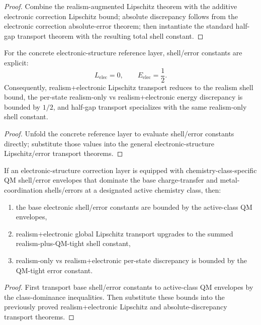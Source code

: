 \begin{proof}
Combine the realism-augmented Lipschitz theorem with the additive electronic correction Lipschitz bound; absolute discrepancy follows from the electronic correction absolute-error theorem; then instantiate the standard half-gap transport theorem with the resulting total shell constant.
\end{proof}

\begin{theorem}\label{thm:electronic-reference-shell-error-transport}
For the concrete electronic-structure reference layer, shell/error constants are explicit:
\[
L_{\mathrm{elec}}=0,\qquad E_{\mathrm{elec}}=\frac12.
\]
Consequently, realism+electronic Lipschitz transport reduces to the realism shell bound, the per-state realism-only vs realism+electronic energy discrepancy is bounded by $1/2$, and half-gap transport specializes with the same realism-only shell constant.
\end{theorem}

\begin{proof}
Unfold the concrete reference layer to evaluate shell/error constants directly; substitute those values into the general electronic-structure Lipschitz/error transport theorems.
\end{proof}

\begin{theorem}\label{thm:qm-grounded-electronic-structure-transport}
If an electronic-structure correction layer is equipped with chemistry-class-specific QM shell/error envelopes that dominate the base charge-transfer and metal-coordination shells/errors at a designated active chemistry class, then:
\begin{enumerate}
\item the base electronic shell/error constants are bounded by the active-class QM envelopes,
\item realism+electronic global Lipschitz transport upgrades to the summed realism-plus-QM-tight shell constant,
\item realism-only vs realism+electronic per-state discrepancy is bounded by the QM-tight error constant.
\end{enumerate}
\end{theorem}

\begin{proof}
First transport base shell/error constants to active-class QM envelopes by the class-dominance inequalities. Then substitute these bounds into the previously proved realism+electronic Lipschitz and absolute-discrepancy transport theorems.
\end{proof}

